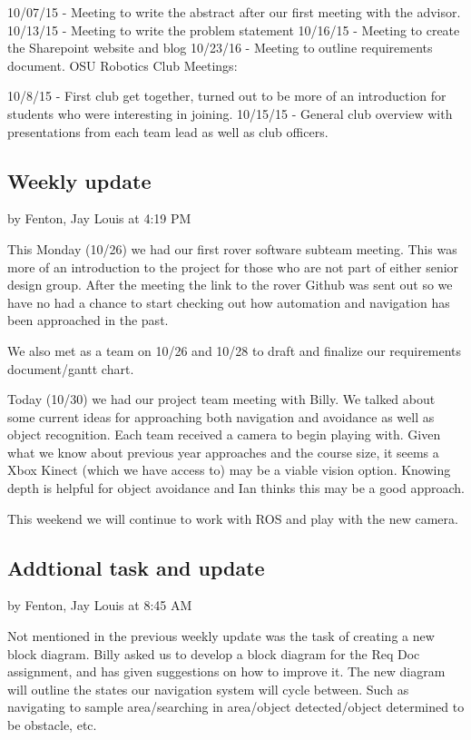 \documentclass[10pt, oneside,onecolumn]{IEEEtran}
\begin{document}
10/07/15 - Meeting to write the abstract after our first meeting with the advisor.
10/13/15 - Meeting to write the problem statement
10/16/15 - Meeting to create the Sharepoint website and blog
10/23/16 - Meeting to outline requirements document.
OSU Robotics Club Meetings:

10/8/15 - First club get together, turned out to be more of an introduction for students who were interesting in joining.
10/15/15 - General club overview with presentations from each team lead as well as club officers. 

\subsection{Weekly update}
by Fenton, Jay Louis at 4:19 PM

This Monday (10/26) we had our first rover software subteam meeting. This was more of an introduction to the project for those who are not part of either senior design group. After the meeting the link to the rover Github was sent out so we have no had a chance to start checking out how automation and navigation has been approached in the past.

We also met as a team on 10/26 and 10/28 to draft and finalize our requirements document/gantt chart. 

Today (10/30) we had our project team meeting with Billy. We talked about some current ideas for approaching both navigation and avoidance as well as object recognition. Each team received a camera to begin playing with. Given what we know about previous year approaches and the course size, it seems a Xbox Kinect (which we have access to) may be a viable vision option. Knowing depth is helpful for object avoidance and Ian thinks this may be a good approach. 

This weekend we will continue to work with ROS and play with the new camera. 

\subsection{Addtional task and update}
by Fenton, Jay Louis at 8:45 AM

Not mentioned in the previous weekly update was the task of creating a new block diagram. Billy asked us to develop a block diagram for the Req Doc assignment, and has given suggestions on how to improve it. The new diagram will outline the states our navigation system will cycle between. Such as navigating to sample area/searching in area/object detected/object determined to be obstacle, etc.
\end{document}
